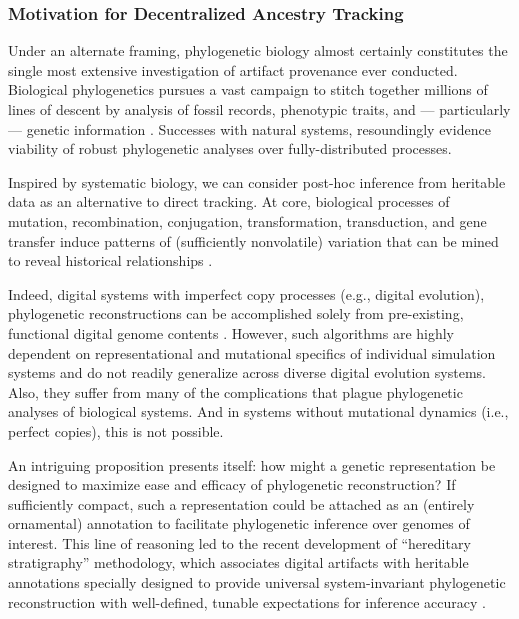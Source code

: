 \subsubsection{Motivation for Decentralized Ancestry Tracking}

Under an alternate framing, phylogenetic biology almost certainly constitutes the single most extensive investigation of artifact provenance ever conducted.
Biological phylogenetics pursues a vast campaign to stitch together millions of lines of descent by analysis of fossil records, phenotypic traits, and --- particularly --- genetic information \citep{hinchliff2015synthesis,lee2015morphological}.
Successes with natural systems, resoundingly evidence viability of robust phylogenetic analyses over fully-distributed processes.

Inspired by systematic biology, we can consider post-hoc inference from heritable data as an alternative to direct tracking.
At core, biological processes of mutation, recombination, conjugation, transformation, transduction, and gene transfer induce patterns of (sufficiently nonvolatile) variation that can be mined to reveal historical relationships .

Indeed, digital systems with imperfect copy processes (e.g., digital evolution), phylogenetic reconstructions can be accomplished solely from pre-existing, functional digital genome contents \citep{moreno2021case}.
However, such algorithms are highly dependent on representational and mutational specifics of individual simulation systems and do not readily generalize across diverse digital evolution systems.
Also, they suffer from many of the complications that plague phylogenetic analyses of biological systems.
And in systems without mutational dynamics (i.e., perfect copies), this is not possible.

An intriguing proposition presents itself: how might a genetic representation be designed to maximize ease and efficacy of phylogenetic reconstruction?
If sufficiently compact, such a representation could be attached as an (entirely ornamental) annotation to facilitate phylogenetic inference over genomes of interest.
This line of reasoning led to the recent development of ``hereditary stratigraphy'' methodology, which associates digital artifacts with heritable annotations specially designed to provide universal system-invariant phylogenetic reconstruction with well-defined, tunable expectations for inference accuracy \citep{moreno2022hereditary}.

